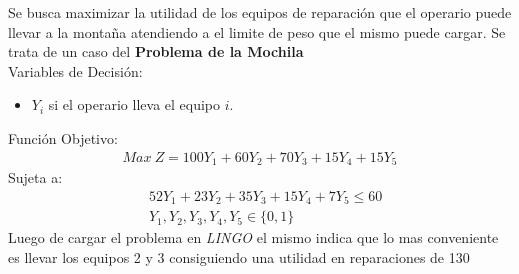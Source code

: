 

\begin{homeworkProblem}
Se busca maximizar la utilidad de los equipos de reparación que el operario puede llevar a la montaña atendiendo a el limite de peso que el mismo puede cargar. Se trata de un caso del \textbf{Problema de la Mochila}\\
Variables de Decisión:
\begin{itemize}
    \item $Y_i$ si el operario lleva el equipo $i$.
\end{itemize}
Función Objetivo:
\begin{align*}
    Max\ Z = 100Y_1 + 60Y_2 + 70Y_3 + 15Y_4 + 15Y_5
\end{align*}
Sujeta a:
\begin{align*}
    &   52Y_1 + 23Y_2 + 35Y_3 + 15Y_4 +7Y_5 \leq 60\\
    &Y_1,Y_2,Y_3,Y_4,Y_5 \in \{0,1\}
\end{align*}
Luego de cargar el problema en \textit{LINGO} el mismo indica que lo mas conveniente es llevar los equipos 2 y 3 consiguiendo una utilidad en reparaciones de 130
\end{homeworkProblem}


